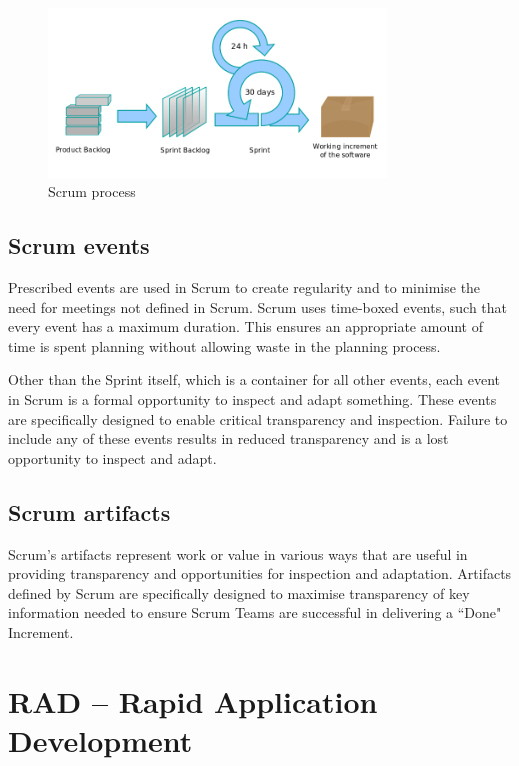 \begin{figure}
	\centering
	\includegraphics[width=0.8\textwidth]{resources/scrum-process.png}
	\caption[Scrum process]{Scrum process}
\end{figure}

\subsection{Scrum events}

Prescribed events are used in Scrum to create regularity and to minimise the need for meetings not defined in Scrum. Scrum uses time-boxed events, such that every event has a maximum duration. This ensures an appropriate amount of time is spent planning without allowing waste in the planning process.

Other than the Sprint itself, which is a container for all other events, each event in Scrum is a formal opportunity to inspect and adapt something. These events are specifically designed to enable critical transparency and inspection. Failure to include any of these events results in reduced transparency and is a lost opportunity to inspect and adapt.

\subsection{Scrum artifacts}

Scrum’s artifacts represent work or value in various ways that are useful in providing transparency and opportunities for inspection and adaptation. Artifacts defined by Scrum are specifically designed to maximise transparency of key information needed to ensure Scrum Teams are successful in delivering a ``Done" Increment.

\section{RAD -- Rapid Application Development}

